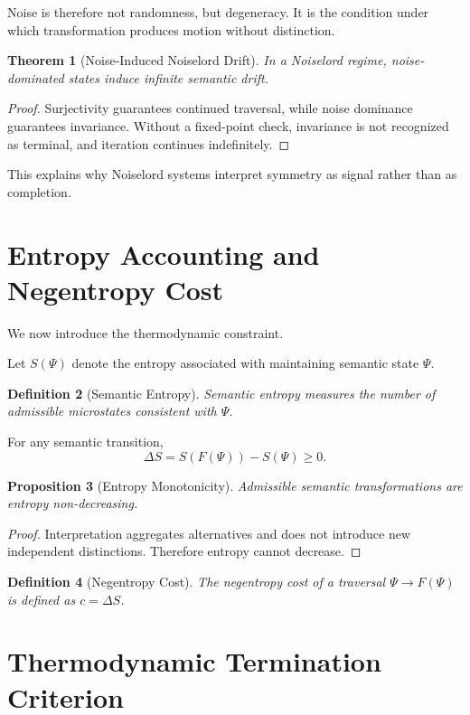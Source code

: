 \documentclass[12pt]{article}
\newtheorem{theorem}{Theorem}[section]
\newtheorem{definition}[theorem]{Definition}
\newtheorem{proposition}[theorem]{Proposition}
\theoremstyle{remark}
\begin{document}
Noise is therefore not randomness, but degeneracy. It is the condition under which transformation produces motion without distinction.

\begin{theorem}[Noise-Induced Noiselord Drift]
In a Noiselord regime, noise-dominated states induce infinite semantic drift.
\end{theorem}

\begin{proof}
Surjectivity guarantees continued traversal, while noise dominance guarantees invariance. Without a fixed-point check, invariance is not recognized as terminal, and iteration continues indefinitely.
\end{proof}

This explains why Noiselord systems interpret symmetry as signal rather than as completion.

\section{Entropy Accounting and Negentropy Cost}

We now introduce the thermodynamic constraint.

Let $S(\Psi)$ denote the entropy associated with maintaining semantic state $\Psi$.

\begin{definition}[Semantic Entropy]
Semantic entropy measures the number of admissible microstates consistent with $\Psi$.
\end{definition}

For any semantic transition,
\[
\Delta S = S(F(\Psi)) - S(\Psi) \ge 0.
\]

\begin{proposition}[Entropy Monotonicity]
Admissible semantic transformations are entropy non-decreasing.
\end{proposition}

\begin{proof}
Interpretation aggregates alternatives and does not introduce new independent distinctions. Therefore entropy cannot decrease.
\end{proof}

\begin{definition}[Negentropy Cost]
The negentropy cost of a traversal $\Psi \to F(\Psi)$ is defined as $c = \Delta S$.
\end{definition}

\section{Thermodynamic Termination Criterion}
\end{document}
